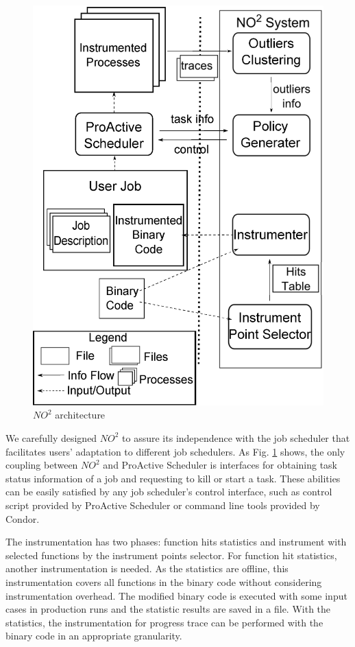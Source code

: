 \begin{figure}
\centering
\includegraphics[width=0.9\columnwidth]{figures/NO2_arch.eps}
\caption{$NO^2$ architecture}
\label{figure:no2arch}
\end{figure}

We carefully designed $NO^2$ to assure its independence with the job scheduler that
facilitates users' adaptation to different job schedulers. As Fig.
\ref{figure:no2arch} shows, the only coupling between $NO^2$ and
ProActive Scheduler is interfaces for obtaining task status information of a job and
requesting to kill or start a task. These abilities can be easily satisfied by any job
scheduler's control interface, such as control script provided by ProActive Scheduler or
command line tools provided by Condor.

The instrumentation has two phases: function hits statistics and instrument with selected
functions by the instrument points selector. For function hit statistics, another
instrumentation is needed. As the statistics are offline, this instrumentation covers all
functions in the binary code without considering instrumentation overhead. The
modified binary code is executed with some input cases in production runs and
the statistic results are saved in a file. With the statistics, the instrumentation for progress
trace can be performed with the binary code in an appropriate granularity.

